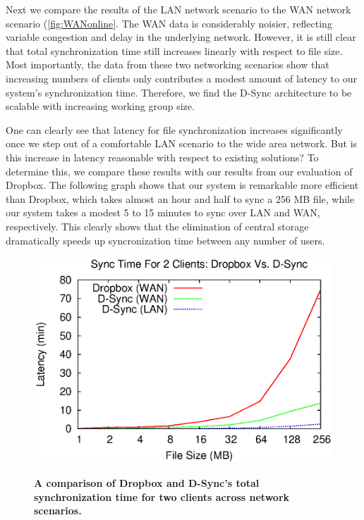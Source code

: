 Next we compare the results of the LAN network scenario to the WAN network scenario (\ref{fig:WANonline}.
The WAN data is considerably noisier,
reflecting variable congestion and delay in the underlying network.
However, it is still clear that total synchronization time still increases
linearly with respect to file size.
Most importantly, the data from these two networking scenarios show
that increasing numbers of clients only contributes a modest
amount of latency to our system's synchronization time.
Therefore, we find the D-Sync architecture to be scalable 
with increasing working group size.

One can clearly see that latency for file synchronization
increases significantly once we step out of a comfortable LAN
scenario to the wide area network.
But is this increase in latency reasonable with respect to existing solutions?
To determine this, we compare these results with our results
from our evaluation of Dropbox. The following graph shows that our system is
remarkable more efficient than Dropbox, which takes almost an hour and half to
sync a 256 MB file, while our system takes a modest 5 to 15 minutes to sync over
LAN and WAN, respectively. This clearly shows that the elimination of
central storage dramatically speeds up syncronization time between
any number of users.

\begin{figure}[h]
    \centering
    \includegraphics[scale=0.5]{figs/Dropbox_Performance.eps}
    \label{fig:dropbox}
    \caption{\textbf{A comparison of Dropbox and D-Sync's total synchronization time for two clients across network scenarios.}}
\end{figure}

